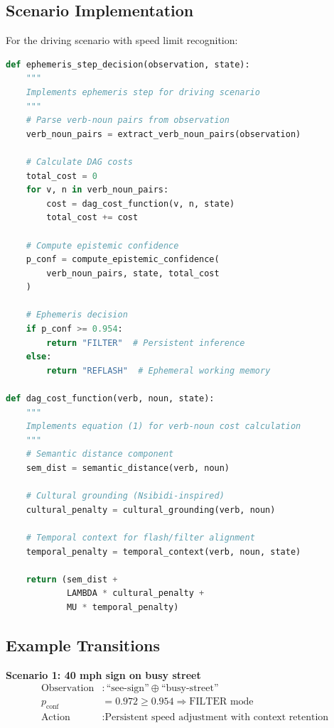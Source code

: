 \documentclass[11pt]{article}
\begin{document}
\subsection{Scenario Implementation}

For the driving scenario with speed limit recognition:

\begin{lstlisting}[language=Python, caption=Ephemeris Step Implementation]
def ephemeris_step_decision(observation, state):
    """
    Implements ephemeris step for driving scenario
    """
    # Parse verb-noun pairs from observation
    verb_noun_pairs = extract_verb_noun_pairs(observation)
    
    # Calculate DAG costs
    total_cost = 0
    for v, n in verb_noun_pairs:
        cost = dag_cost_function(v, n, state)
        total_cost += cost
    
    # Compute epistemic confidence
    p_conf = compute_epistemic_confidence(
        verb_noun_pairs, state, total_cost
    )
    
    # Ephemeris decision
    if p_conf >= 0.954:
        return "FILTER"  # Persistent inference
    else:
        return "REFLASH"  # Ephemeral working memory
        
def dag_cost_function(verb, noun, state):
    """
    Implements equation (1) for verb-noun cost calculation
    """
    # Semantic distance component
    sem_dist = semantic_distance(verb, noun)
    
    # Cultural grounding (Nsibidi-inspired)
    cultural_penalty = cultural_grounding(verb, noun)
    
    # Temporal context for flash/filter alignment  
    temporal_penalty = temporal_context(verb, noun, state)
    
    return (sem_dist + 
            LAMBDA * cultural_penalty + 
            MU * temporal_penalty)
\end{lstlisting}

\subsection{Example Transitions}

\textbf{Scenario 1: 40 mph sign on busy street}
\begin{align}
\text{Observation} &: \text{``see-sign''} \oplus \text{``busy-street''} \\
p_{\text{conf}} &= 0.972 \geq 0.954 \Rightarrow \text{FILTER mode} \\
\text{Action} &: \text{Persistent speed adjustment with context retention}
\end{align}
\end{document}
